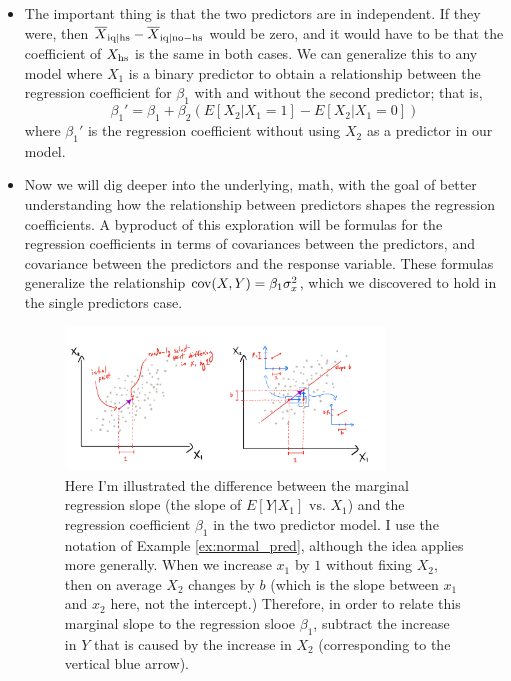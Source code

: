 \begin{itemize}
\begin{example}
\end{example}




  
  
\item The important thing is that the two predictors are in independent. If they were, then $\overline{X}_{{\rm iq}|{\rm hs}}-\overline{X}_{{\rm iq}|{\rm no-hs}}$ would be zero, and it would have to be that the coefficient of $X_{\rm hs}$ is the same in both cases. We can generalize this to any model where $X_1$ is a binary predictor to obtain a relationship between the regression coefficient for $\beta_1$ with and without the second predictor; that is, 
\begin{equation*}
\beta_1' = \beta_1 + \beta_2(E[X_2|X_1=1]-E[X_2|X_1=0])
\end{equation*}
where $\beta_1'$ is the regression coefficient without using $X_2$ as a predictor in our model. 
\item Now we will dig deeper into the underlying, math, with the goal of better understanding how the relationship between predictors shapes the regression coefficients. A byproduct of this exploration will be formulas for the regression coefficients in terms of covariances between the predictors, and covariance between the predictors and the response variable. These formulas generalize the relationship ${\rm cov}(X,Y) = \beta_1\sigma_x^2$, which we discovered to hold in the single predictors case. 


\begin{figure}[h]
    \centering
    \includegraphics[width=0.8\textwidth]{./../figures/correlated_predictors}
    \caption{Here I'm illustrated the difference between the marginal regression slope (the slope of $E[Y|X_1]$ vs. $X_1$) and the regression coefficient $\beta_1$ in the two predictor model.  I use the notation of Example \ref{ex:normal_pred}, although the idea applies more generally. When we increase $x_1$ by $1$ without fixing $X_2$, then on average $X_2$ changes by $b$ (which is the slope between $x_1$ and $x_2$ here, not the intercept.) Therefore, in order to relate this marginal slope to the regression slooe $\beta_1$, subtract the increase in $Y$ that is caused by the increase in $X_2$ (corresponding to the vertical blue arrow).   }
    \label{fig:plane}
\end{figure}


\end{itemize}
